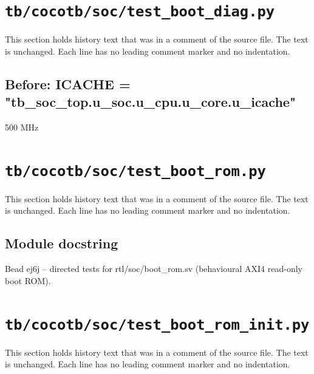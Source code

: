 \section{\texttt{tb/cocotb/soc/test\_boot\_diag.py}}\label{cr:suite:soc-test-boot-diag}

This section holds history text that was in a comment of the source file. The text is unchanged. Each line has no leading comment marker and no indentation.

\begin{record}

\subsection*{Before: ICACHE = "tb\_soc\_top.u\_soc.u\_cpu.u\_core.u\_icache"}

\begin{textblock}
500 MHz
\end{textblock}

\end{record}

\section{\texttt{tb/cocotb/soc/test\_boot\_rom.py}}\label{cr:suite:soc-test-boot-rom}

This section holds history text that was in a comment of the source file. The text is unchanged. Each line has no leading comment marker and no indentation.

\begin{record}

\subsection*{Module docstring}

\begin{textblock}
Bead ej6j -- directed tests for rtl/soc/boot_rom.sv (behavioural AXI4 read-only boot ROM).
\end{textblock}

\end{record}

\section{\texttt{tb/cocotb/soc/test\_boot\_rom\_init.py}}\label{cr:suite:soc-test-boot-rom-init}

This section holds history text that was in a comment of the source file. The text is unchanged. Each line has no leading comment marker and no indentation.

